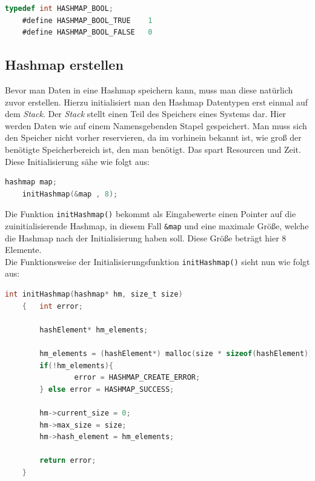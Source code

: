 \documentclass[11pt,a4paper]{article}
\begin{document}
\begin{lstlisting}[language=C]
    typedef int HASHMAP_BOOL;
    #define HASHMAP_BOOL_TRUE    1
    #define HASHMAP_BOOL_FALSE   0
\end{lstlisting}


\subsection{Hashmap erstellen}
Bevor man Daten in eine Hashmap speichern kann, muss man diese natürlich zuvor erstellen. Hierzu initialisiert man den Hashmap Datentypen 
erst einmal auf dem \textit{Stack}. Der \textit{Stack} stellt einen Teil des Speichers eines Systems dar. Hier werden Daten wie auf einem 
Namensgebenden Stapel gespeichert. Man muss sich den Speicher nicht vorher reservieren, da im vorhinein bekannt ist, wie groß der benötigte 
Speicherbereich ist, den man benötigt. Das spart Resourcen und Zeit. Diese Initialisierung sähe wie folgt aus:\\

\begin{lstlisting}[language=C]
    hashmap map;
    initHashmap(&map , 8);
\end{lstlisting}

Die Funktion \lstinline{initHashmap()} bekommt als Eingabewerte einen Pointer auf die zuinitialisierende Hashmap, in diesem Fall \lstinline{&map} 
und eine maximale Größe, welche die Hashmap nach der Initialisierung haben soll. Diese Größe beträgt hier 8 Elemente.\\
Die Funktionsweise der Initialisierungsfunktion  \lstinline{initHashmap()} sieht nun wie folgt aus:\\

\begin{lstlisting}[language=C]
    int initHashmap(hashmap* hm, size_t size)
    {   int error;
    
        hashElement* hm_elements;

        hm_elements = (hashElement*) malloc(size * sizeof(hashElement));
        if(!hm_elements){
                error = HASHMAP_CREATE_ERROR;
        } else error = HASHMAP_SUCCESS;

        hm->current_size = 0;
        hm->max_size = size;
        hm->hash_element = hm_elements;

        return error;
    }

\end{lstlisting}
\end{document}
